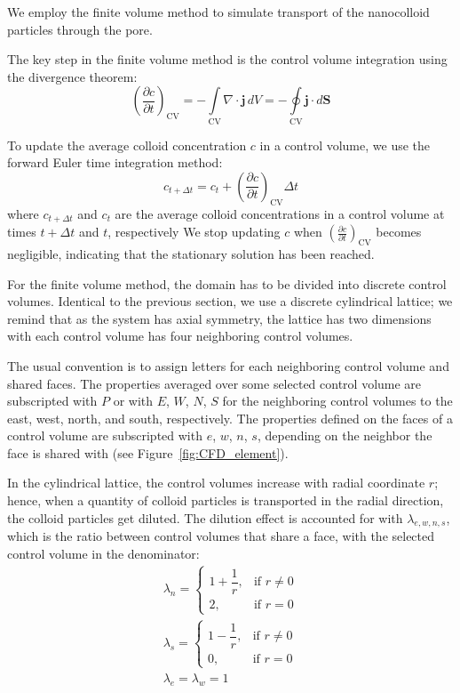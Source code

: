 \documentclass[10pt, a4paper]{article}
\begin{document}
\begin{multicols}{2}
We employ the finite volume method to simulate transport of the nanocolloid particles through the pore.

The key step in the finite volume method is the control volume integration using the divergence theorem:
\begin{equation}
    \label{eq:CFD_integration_1}
    \left( \frac{\partial c}{\partial t} \right)_{\textrm{CV}} = -\int\limits_{\textrm{CV}} \nabla \cdot \mathbf{j} \, dV = -\oint\limits_{\textrm{CV}} \mathbf{j} \cdot d\mathbf{S}
\end{equation}

To update the average colloid concentration $c$ in a control volume, we use the forward Euler time integration method:
\begin{equation}
    c_{t + \Delta t} = c_t + \left( \frac{\partial c}{\partial t} \right)_{\textrm{CV}} \Delta t
\end{equation}
where $c_{t + \Delta t}$ and $c_t$ are the average colloid concentrations in a control volume at times $t + \Delta t$ and $t$, respectively
We stop updating $c$ when $\left( \frac{\partial c}{\partial t} \right)_{\textrm{CV}}$ becomes negligible, indicating that the stationary solution has been reached.

For the finite volume method, the domain has to be divided into discrete control volumes.
Identical to the previous section, we use a discrete cylindrical lattice; we remind that as the system has axial symmetry, the lattice has two dimensions with each control volume has four neighboring control volumes.

The usual convention is to assign letters for each neighboring control volume and shared faces.
The properties averaged over some selected control volume are subscripted with $P$ or with $E$, $W$, $N$, $S$ for the neighboring control volumes to the east, west, north, and south, respectively.
The properties defined on the faces of a control volume are subscripted with $e$, $w$, $n$, $s$, depending on the neighbor the face is shared with (see Figure~\ref{fig:CFD_element}).

In the cylindrical lattice, the control volumes increase with radial coordinate $r$; hence, when a quantity of colloid particles is transported in the radial direction, the colloid particles get diluted.
The dilution effect is accounted for with $\lambda_{e,w,n,s}$, which is the ratio between control volumes that share a face, with the selected control volume in the denominator:
\begin{eqnarray}
    \lambda_n =\begin{cases}
        1 + \dfrac{1}{r}, & \text{if } r \ne 0\\
        2, & \text{if } r = 0
    \end{cases}
    \\
    \lambda_s =\begin{cases}
        1 - \dfrac{1}{r}, & \text{if } r \ne 0\\
        0, & \text{if } r = 0
    \end{cases}
    \\
    \lambda_{e} = \lambda_{w} = 1
\end{eqnarray}


\end{multicols}
\end{document}
